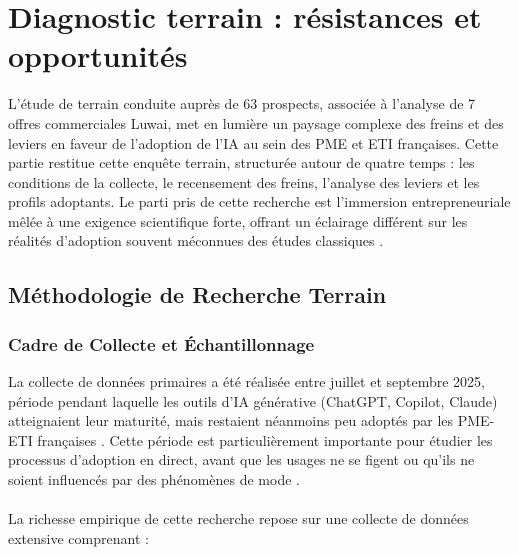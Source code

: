 \chapter{Diagnostic terrain : résistances et opportunités}
\label{chap:field_diagnosis}

L'étude de terrain conduite auprès de 63 prospects, associée à l'analyse de 7 offres commerciales Luwai, met en lumière un paysage complexe des freins et des leviers en faveur de l'adoption de l'IA au sein des PME et ETI françaises. Cette partie restitue cette enquête terrain, structurée autour de quatre temps : les conditions de la collecte, le recensement des freins, l'analyse des leviers et les profils adoptants. Le parti pris de cette recherche est l'immersion entrepreneuriale mêlée à une exigence scientifique forte, offrant un éclairage différent sur les réalités d'adoption souvent méconnues des études classiques \cite{yin2018case}.

\section{Méthodologie de Recherche Terrain}

\subsection{Cadre de Collecte et Échantillonnage}

La collecte de données primaires a été réalisée entre juillet et septembre 2025, période pendant laquelle les outils d’IA générative (ChatGPT, Copilot, Claude) atteignaient leur maturité, mais restaient néanmoins peu adoptés par les PME-ETI françaises \cite{bpifrance2025ia}. Cette période est particulièrement importante pour étudier les processus d’adoption en direct, avant que les usages ne se figent ou qu’ils ne soient influencés par des phénomènes de mode \cite{rogers2003diffusion}.
\\\\
La richesse empirique de cette recherche repose sur une collecte de données extensive comprenant :

